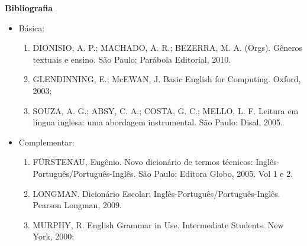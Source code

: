 
\begin{snugshade}\begin{center}\textbf{
    Bibliografia
}\end{center}\end{snugshade}

\begin{itemize} 

\item Básica:
    \begin{enumerate}

    \item DIONISIO, A. P.; MACHADO, A. R.; BEZERRA, M. A. (Orgs). Gêneros textuais e ensino. São Paulo: Parábola Editorial, 2010.
    
    \item GLENDINNING, E.; McEWAN, J. Basic English for Computing. Oxford, 2003;
    
    \item SOUZA, A. G.; ABSY, C. A.; COSTA, G. C.; MELLO, L. F. Leitura em língua inglesa: uma abordagem instrumental. São Paulo: Disal, 2005.
	
    \end{enumerate}

\item Complementar:
	\begin{enumerate} 

    \item FÜRSTENAU, Eugênio. Novo dicionário de termos técnicos: Inglês-Português/Português-Inglês. São Paulo: Editora Globo, 2005. Vol 1 e 2.

    \item LONGMAN. Dicionário Escolar: Inglês-Português/Português-Inglês. Pearson Longman, 2009.

    \item MURPHY, R. English Grammar in Use. Intermediate Students. New York, 2000;

	\end{enumerate}

\end{itemize}

